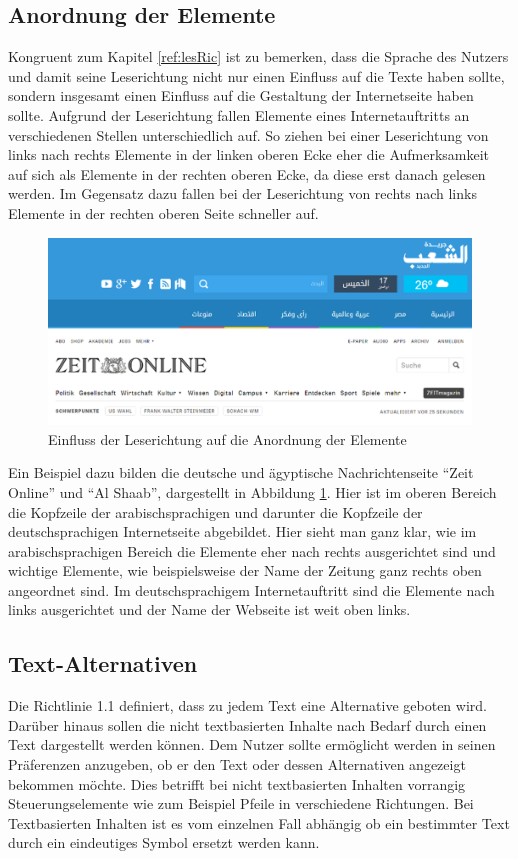 \documentclass[12pt, paper=a4, bibtotoc, toc=listof, headsepline=true, numbers=endperiod]{scrreprt}
\begin{document}
\subsection{Anordnung der Elemente}
Kongruent zum Kapitel \ref{ref:lesRic} ist zu bemerken, dass die Sprache des Nutzers und damit seine Leserichtung nicht nur einen Einfluss auf die Texte haben sollte, sondern insgesamt einen Einfluss auf die Gestaltung der Internetseite haben sollte. Aufgrund der Leserichtung fallen Elemente eines Internetauftritts an verschiedenen Stellen unterschiedlich auf. So ziehen bei einer Leserichtung von links nach rechts Elemente in der linken oberen Ecke eher die Aufmerksamkeit auf sich als Elemente in der rechten oberen Ecke, da diese erst danach gelesen werden. Im Gegensatz dazu fallen bei der Leserichtung von rechts nach links Elemente in der rechten oberen Seite schneller auf\cite[S.47 f.]{meidl2013global}.
\begin{figure}
	\centering
	\includegraphics[width=\textwidth,height=\textheight,keepaspectratio]{leserichtung.png}
	\caption[Einfluss der Leserichtung auf Anordnung der Elemente]{Einfluss der Leserichtung auf die Anordnung der Elemente\cite{elShaab}\cite{zeitOnline}}
	\label{img:lesRic}
\end{figure}
Ein Beispiel dazu bilden die deutsche und ägyptische Nachrichtenseite \enquote{Zeit Online} und \enquote{Al Shaab}, dargestellt in Abbildung  \ref{img:lesRic}. Hier ist im oberen Bereich die Kopfzeile der arabischsprachigen und darunter die Kopfzeile der deutschsprachigen Internetseite abgebildet. Hier sieht man ganz klar, wie im arabischsprachigen Bereich die Elemente eher nach rechts ausgerichtet sind und wichtige Elemente, wie beispielsweise der Name der Zeitung ganz rechts oben angeordnet sind. Im deutschsprachigem Internetauftritt sind die Elemente nach links ausgerichtet und der Name der Webseite ist weit oben links.
\subsection{Text-Alternativen}
Die Richtlinie 1.1 definiert, dass zu jedem Text eine Alternative geboten wird. Darüber hinaus sollen die nicht textbasierten Inhalte nach Bedarf durch einen Text dargestellt werden können. Dem Nutzer sollte ermöglicht werden in seinen Präferenzen anzugeben, ob er den Text oder dessen Alternativen angezeigt bekommen möchte. Dies betrifft bei nicht textbasierten Inhalten vorrangig Steuerungselemente wie zum Beispiel Pfeile in verschiedene Richtungen. Bei Textbasierten Inhalten ist es vom einzelnen Fall abhängig ob ein bestimmter Text durch ein eindeutiges Symbol ersetzt werden kann.
\end{document}
